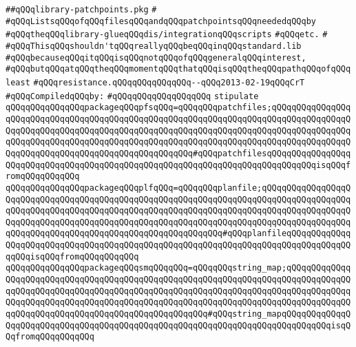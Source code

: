 \label{src/lib/make-library-glue/library-patchpoints.pkg}
\verb|##qQQqlibrary-patchpoints.pkg|\newline
\verb|#|\newline
\verb|#qQQqListsqQQqofqQQqfilesqQQqandqQQqpatchpointsqQQqneededqQQqby|\newline
\verb|#qQQqtheqQQqlibrary-glueqQQqdis/integrationqQQqscripts|\newline
\verb|#qQQqetc.|\newline
\verb|#|\newline
\verb|#qQQqThisqQQqshouldn'tqQQqreallyqQQqbeqQQqinqQQqstandard.lib|\newline
\verb|#qQQqbecauseqQQqitqQQqisqQQqnotqQQqofqQQqgeneralqQQqinterest,|\newline
\verb|#qQQqbutqQQqatqQQqtheqQQqmomentqQQqthatqQQqisqQQqtheqQQqpathqQQqofqQQqleast|\newline
\verb|#qQQqresistance.qQQqqQQqqQQqqQQq--qQQq2013-02-19qQQqCrT|\newline
\newline
\verb|#qQQqCompiledqQQqby:|\newline
\verb|#qQQqqQQqqQQqqQQqqQQq|\newline
\newline
\verb|stipulate|\newline
\verb|qQQqqQQqqQQqqQQqpackageqQQqpfsqQQq=qQQqqQQqpatchfiles;qQQqqQQqqQQqqQQqqQQqqQQqqQQqqQQqqQQqqQQqqQQqqQQqqQQqqQQqqQQqqQQqqQQqqQQqqQQqqQQqqQQqqQQqqQQqqQQqqQQqqQQqqQQqqQQqqQQqqQQqqQQqqQQqqQQqqQQqqQQqqQQqqQQqqQQqqQQqqQQqqQQqqQQqqQQqqQQqqQQqqQQqqQQqqQQqqQQqqQQqqQQqqQQqqQQqqQQqqQQqqQQqqQQqqQQqqQQqqQQqqQQqqQQqqQQqqQQqqQQqqQQq#qQQqpatchfilesqQQqqQQqqQQqqQQqqQQqqQQqqQQqqQQqqQQqqQQqqQQqqQQqqQQqqQQqqQQqqQQqqQQqqQQqqQQqqQQqisqQQqfromqQQqqQQqqQQq|\newline
\verb|qQQqqQQqqQQqqQQqpackageqQQqplfqQQq=qQQqqQQqplanfile;qQQqqQQqqQQqqQQqqQQqqQQqqQQqqQQqqQQqqQQqqQQqqQQqqQQqqQQqqQQqqQQqqQQqqQQqqQQqqQQqqQQqqQQqqQQqqQQqqQQqqQQqqQQqqQQqqQQqqQQqqQQqqQQqqQQqqQQqqQQqqQQqqQQqqQQqqQQqqQQqqQQqqQQqqQQqqQQqqQQqqQQqqQQqqQQqqQQqqQQqqQQqqQQqqQQqqQQqqQQqqQQqqQQqqQQqqQQqqQQqqQQqqQQqqQQqqQQqqQQqqQQqqQQqqQQq#qQQqplanfileqQQqqQQqqQQqqQQqqQQqqQQqqQQqqQQqqQQqqQQqqQQqqQQqqQQqqQQqqQQqqQQqqQQqqQQqqQQqqQQqqQQqqQQqisqQQqfromqQQqqQQqqQQq|\newline
\verb|qQQqqQQqqQQqqQQqpackageqQQqsmqQQqqQQq=qQQqqQQqstring_map;qQQqqQQqqQQqqQQqqQQqqQQqqQQqqQQqqQQqqQQqqQQqqQQqqQQqqQQqqQQqqQQqqQQqqQQqqQQqqQQqqQQqqQQqqQQqqQQqqQQqqQQqqQQqqQQqqQQqqQQqqQQqqQQqqQQqqQQqqQQqqQQqqQQqqQQqqQQqqQQqqQQqqQQqqQQqqQQqqQQqqQQqqQQqqQQqqQQqqQQqqQQqqQQqqQQqqQQqqQQqqQQqqQQqqQQqqQQqqQQqqQQqqQQqqQQqqQQqqQQqqQQq#qQQqstring_mapqQQqqQQqqQQqqQQqqQQqqQQqqQQqqQQqqQQqqQQqqQQqqQQqqQQqqQQqqQQqqQQqqQQqqQQqqQQqqQQqisqQQqfromqQQqqQQqqQQq|\newline
